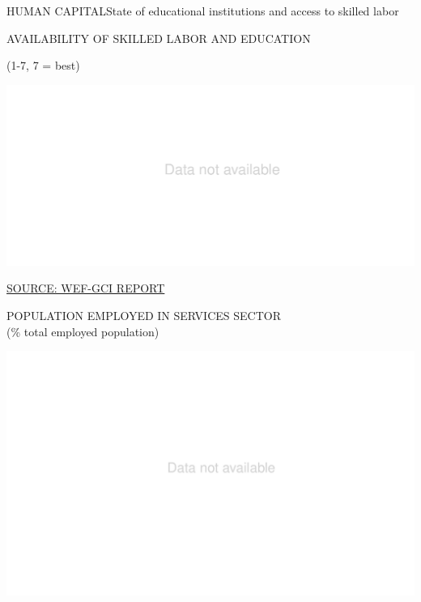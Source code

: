 \documentclass{article}\usepackage[]{graphicx}\usepackage[]{color}
\makeatletter
\def\maxwidth{ %
  \ifdim\Gin@nat@width>\linewidth
    \linewidth
  \else
    \Gin@nat@width
  \fi
}
\makeatother
\begin{document}
\begin{minipage}[b]{0.95\textwidth}
   \vspace{5ex}
   \begin{flushleft}  
     \hspace{4ex}\Large{\textcolor[HTML]{22A6F5}{HUMAN CAPITAL}}\hspace{2ex}\small{\textcolor[HTML]{818181}{State of educational institutions and access to skilled labor}}
   \end{flushleft} 
  \begin{minipage}[c]{0.55\textwidth} %
    \hspace{4ex}\small{\textcolor[HTML]{818181}{AVAILABILITY OF SKILLED LABOR AND EDUCATION}} 
    
    \hspace{4ex}\footnotesize{\textcolor[HTML]{818181}{(1-7, 7 = best)}}


\hfill{}\includegraphics[width=\maxwidth]{figure/bar_facewrap_chart_Human-1} 



    \hspace{4ex}\scriptsize{\href{http://reports.weforum.org/global-competitiveness-index/}{\textcolor[HTML]{22A6F5}{SOURCE: WEF-GCI REPORT}}}
  \end{minipage}
  \begin{minipage}[c]{0.43\textwidth} %
    \small{\textcolor[HTML]{818181}{POPULATION EMPLOYED IN SERVICES SECTOR \\ \footnotesize(\% total employed population)}}
    \vspace{-2ex}


{\centering \includegraphics[width=\maxwidth]{figure/pie_chart_double_Human-1} 

}
\end{minipage}
\end{minipage}
\end{document}
